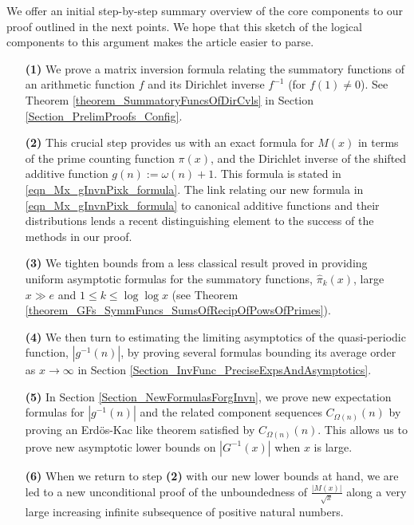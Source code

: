 \documentclass[11pt,reqno,a4letter]{article}
\numberwithin{figure}{section}
\numberwithin{table}{section}
\theoremstyle{plain}
\numberwithin{theorem}{section}
\theoremstyle{definition}
\begin{document}
We offer an initial step-by-step summary overview of the core components 
to our proof outlined in the next points. 
We hope that this sketch of the logical components 
to this argument makes the article easier to parse. 
\begin{itemize} 

\item[\textbf{(1)}] We prove a matrix inversion formula relating the summatory 
           functions of an arithmetic function $f$ and its Dirichlet inverse $f^{-1}$ (for $f(1) \neq 0$). 
           See Theorem \ref{theorem_SummatoryFuncsOfDirCvls} in 
           Section \ref{Section_PrelimProofs_Config}.  
\item[\textbf{(2)}] This crucial step provides us with an exact formula for $M(x)$ in terms of 
           the prime counting function $\pi(x)$, and the 
           Dirichlet inverse of the shifted additive function $g(n) := \omega(n) + 1$. This 
           formula is stated in \eqref{eqn_Mx_gInvnPixk_formula}. 
           The link relating our new formula in 
           \eqref{eqn_Mx_gInvnPixk_formula} to canonical additive functions and their 
           distributions lends a recent distinguishing element to the 
           success of the methods in our proof. 
\item[\textbf{(3)}] We tighten bounds from a less classical result proved in 
            \cite[\S 7]{MV} providing uniform asymptotic formulas for the  
           summatory functions, $\widehat{\pi}_k(x)$, large $x \gg e$ and 
           $1 \leq k \leq \log\log x$ 
           (see Theorem \ref{theorem_GFs_SymmFuncs_SumsOfRecipOfPowsOfPrimes}). 
\item[\textbf{(4)}] We then turn to estimating the limiting 
           asymptotics of the quasi-periodic function, $|g^{-1}(n)|$, by proving several formulas bounding its 
           average order as $x \rightarrow \infty$ in 
           Section \ref{Section_InvFunc_PreciseExpsAndAsymptotics}. 
\item[\textbf{(5)}] In Section \ref{Section_NewFormulasForgInvn}, 
           we prove new expectation formulas for $|g^{-1}(n)|$ and the related component sequences 
           $C_{\Omega(n)}(n)$ by proving an Erd\"os-Kac like theorem satisfied by $C_{\Omega(n)}(n)$. 
           This allows us to prove new asymptotic lower bounds on $|G^{-1}(x)|$ when $x$ is large. 
\item[\textbf{(6)}] When we return to step \textbf{(2)} 
           with our new lower bounds at hand, we are led to a new unconditional proof of the 
           unboundedness of $\frac{|M(x)|}{\sqrt{x}}$ 
           along a very large increasing infinite subsequence of positive natural numbers. 
           
\end{itemize} 
\end{document}
